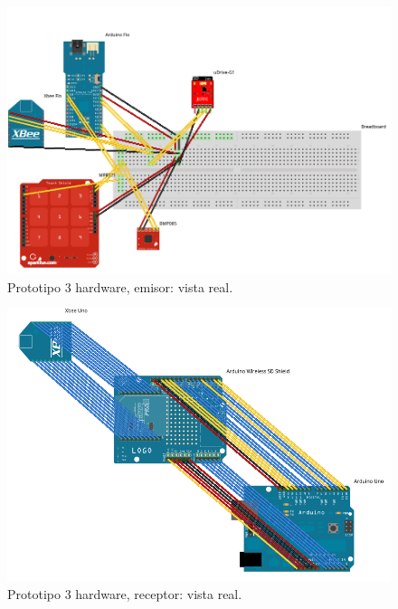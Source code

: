   \begin{figure}[htbp]
   \centering
   \includegraphics[scale=0.55,keepaspectratio=true]{./imagenes/prototipo3_bb_1.png}
   \caption{Prototipo 3 hardware, emisor: vista real.}
   \label{figura:Prototipo3HardwareBB1}
  \end{figure}

  \begin{figure}[htbp]
   \centering
   \includegraphics[scale=0.55,keepaspectratio=true]{./imagenes/prototipo3_bb_2.png}
   \caption{Prototipo 3 hardware, receptor: vista real.}
   \label{figura:Prototipo3HardwareBB2}
  \end{figure}

